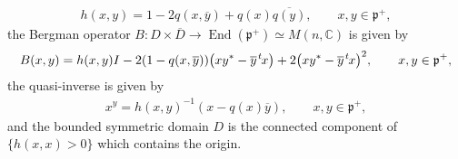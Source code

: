 \documentclass[pdftex]{sigma}
\numberwithin{equation}{section}
\newcommand{\BC}{\mathbb{C}}
\newcommand{\fp}{\mathfrak{p}}
\newcommand{\End}{\operatorname{End}}
\begin{document}
\begin{gather*} h(x,y)=1-2q(x,\overline{y})+q(x)\overline{q(y)}, \qquad x,y\in\fp^+, \end{gather*}
the Bergman operator $B\colon D\times \overline{D}\to \End(\fp^+)\simeq M(n,\BC)$ is given by
\begin{gather*} B(x,y)=h(x,y)I-2(1-q(x,\overline{y}))\big(xy^*-\overline{y}\hspace{1pt}{}^t\hspace{-1pt}x\big)
+2\big(xy^*-\overline{y}\hspace{1pt}{}^t\hspace{-1pt}x\big)^2, \qquad x,y\in\fp^+, \end{gather*}
the quasi-inverse is given by
\begin{gather*} x^y=h(x,y)^{-1}(x-q(x)\overline{y}), \qquad x,y\in\fp^+, \end{gather*}
and the bounded symmetric domain $D$ is the connected component of $\{h(x,x)>0\}$ which contains the origin.
\end{document}
